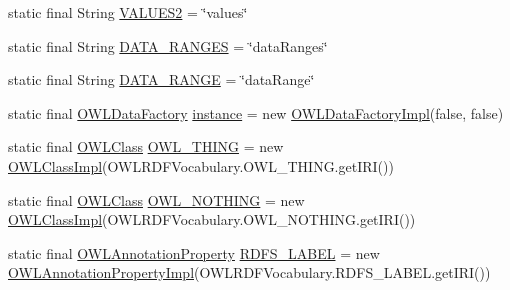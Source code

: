 \begin{DoxyCompactItemize}
\item 
static final String \hyperlink{classuk_1_1ac_1_1manchester_1_1cs_1_1owl_1_1owlapi_1_1_o_w_l_data_factory_impl_af483823c73a9ea314d5f42b837c5e760}{V\-A\-L\-U\-E\-S2} = \char`\"{}values\char`\"{}
\item 
static final String \hyperlink{classuk_1_1ac_1_1manchester_1_1cs_1_1owl_1_1owlapi_1_1_o_w_l_data_factory_impl_a0f20c8e2f7e2b58c9aaf8344375af486}{D\-A\-T\-A\-\_\-\-R\-A\-N\-G\-E\-S} = \char`\"{}data\-Ranges\char`\"{}
\item 
static final String \hyperlink{classuk_1_1ac_1_1manchester_1_1cs_1_1owl_1_1owlapi_1_1_o_w_l_data_factory_impl_ab4da2a82b3d80834558566b517bebd19}{D\-A\-T\-A\-\_\-\-R\-A\-N\-G\-E} = \char`\"{}data\-Range\char`\"{}
\item 
static final \hyperlink{interfaceorg_1_1semanticweb_1_1owlapi_1_1model_1_1_o_w_l_data_factory}{O\-W\-L\-Data\-Factory} \hyperlink{classuk_1_1ac_1_1manchester_1_1cs_1_1owl_1_1owlapi_1_1_o_w_l_data_factory_impl_ae08cf9eeb0bd508786611090f8db9766}{instance} = new \hyperlink{classuk_1_1ac_1_1manchester_1_1cs_1_1owl_1_1owlapi_1_1_o_w_l_data_factory_impl}{O\-W\-L\-Data\-Factory\-Impl}(false, false)
\item 
static final \hyperlink{interfaceorg_1_1semanticweb_1_1owlapi_1_1model_1_1_o_w_l_class}{O\-W\-L\-Class} \hyperlink{classuk_1_1ac_1_1manchester_1_1cs_1_1owl_1_1owlapi_1_1_o_w_l_data_factory_impl_a1e59f28fa2fef3ac936d451118330e04}{O\-W\-L\-\_\-\-T\-H\-I\-N\-G} = new \hyperlink{classuk_1_1ac_1_1manchester_1_1cs_1_1owl_1_1owlapi_1_1_o_w_l_class_impl}{O\-W\-L\-Class\-Impl}(O\-W\-L\-R\-D\-F\-Vocabulary.\-O\-W\-L\-\_\-\-T\-H\-I\-N\-G.\-get\-I\-R\-I())
\item 
static final \hyperlink{interfaceorg_1_1semanticweb_1_1owlapi_1_1model_1_1_o_w_l_class}{O\-W\-L\-Class} \hyperlink{classuk_1_1ac_1_1manchester_1_1cs_1_1owl_1_1owlapi_1_1_o_w_l_data_factory_impl_a570b5331e948f16ffd2ccdd482280561}{O\-W\-L\-\_\-\-N\-O\-T\-H\-I\-N\-G} = new \hyperlink{classuk_1_1ac_1_1manchester_1_1cs_1_1owl_1_1owlapi_1_1_o_w_l_class_impl}{O\-W\-L\-Class\-Impl}(O\-W\-L\-R\-D\-F\-Vocabulary.\-O\-W\-L\-\_\-\-N\-O\-T\-H\-I\-N\-G.\-get\-I\-R\-I())
\item 
static final \hyperlink{interfaceorg_1_1semanticweb_1_1owlapi_1_1model_1_1_o_w_l_annotation_property}{O\-W\-L\-Annotation\-Property} \hyperlink{classuk_1_1ac_1_1manchester_1_1cs_1_1owl_1_1owlapi_1_1_o_w_l_data_factory_impl_ae7385867c4be89a2edd795d743f247f0}{R\-D\-F\-S\-\_\-\-L\-A\-B\-E\-L} = new \hyperlink{classuk_1_1ac_1_1manchester_1_1cs_1_1owl_1_1owlapi_1_1_o_w_l_annotation_property_impl}{O\-W\-L\-Annotation\-Property\-Impl}(O\-W\-L\-R\-D\-F\-Vocabulary.\-R\-D\-F\-S\-\_\-\-L\-A\-B\-E\-L.\-get\-I\-R\-I())

\end{DoxyCompactItemize}
